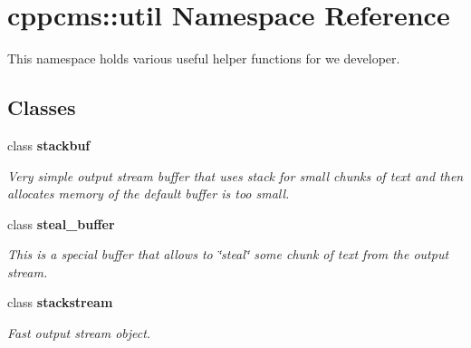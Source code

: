 \section{cppcms\-:\-:util Namespace Reference}
\label{namespacecppcms_1_1util}


This namespace holds various useful helper functions for we developer.  


\subsection*{Classes}
\begin{DoxyCompactItemize}
\item 
class {\bf stackbuf}
\begin{DoxyCompactList}\small\item\em Very simple output stream buffer that uses stack for small chunks of text and then allocates memory of the default buffer is too small. \end{DoxyCompactList}\item 
class {\bf steal\-\_\-buffer}
\begin{DoxyCompactList}\small\item\em This is a special buffer that allows to \char`\"{}steal\char`\"{} some chunk of text from the output stream. \end{DoxyCompactList}\item 
class {\bf stackstream}
\begin{DoxyCompactList}\small\item\em Fast output stream object. \end{DoxyCompactList}\end{DoxyCompactItemize}
